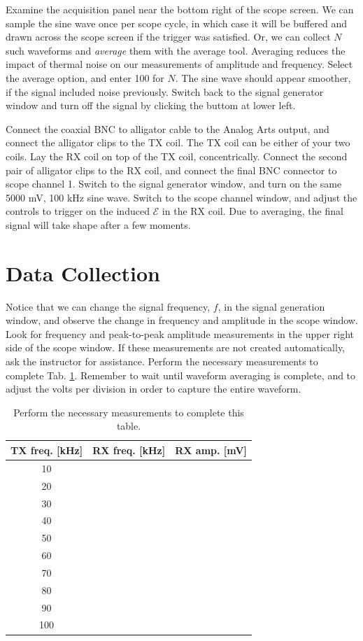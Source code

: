 \documentclass[12pt,twocolumn]{article}
\begin{document}
Examine the acquisition panel near the bottom right of the scope screen.  We can sample the sine wave once per scope cycle, in which case it will be buffered and drawn across the scope screen if the trigger was satisfied.  Or, we can collect $N$ such waveforms and \textit{average} them with the average tool.  Averaging reduces the impact of thermal noise on our measurements of amplitude and frequency.  Select the average option, and enter 100 for $N$.  The sine wave should appear smoother, if the signal included noise previously.  Switch back to the signal generator window and turn off the signal by clicking the buttom at lower left.

Connect the coaxial BNC to alligator cable to the Analog Arts output, and connect the alligator clips to the TX coil.  The TX coil can be either of your two coils.  Lay the RX coil on top of the TX coil, concentrically.  Connect the second pair of alligator clips to the RX coil, and connect the final BNC connector to scope channel 1.  Switch to the signal generator window, and turn on the same 5000 mV, 100 kHz sine wave.  Switch to the scope channel window, and adjust the controls to trigger on the induced $\mathcal{E}$ in the RX coil.  Due to averaging, the final signal will take shape after a few moments.

\section{Data Collection}

Notice that we can change the signal frequency, $f$, in the signal generation window, and observe the change in frequency and amplitude in the scope window.  Look for frequency and peak-to-peak amplitude measurements in the upper right side of the scope window.  If these measurements are not created automatically, ask the instructor for assistance.  Perform the necessary measurements to complete Tab. \ref{tab:data}.  Remember to wait until waveform averaging is complete, and to adjust the volts per division in order to capture the entire waveform.

\begin{table}[ht]
\footnotesize
\begin{tabular}{| c | c | c |}
\hline
\textbf{TX freq.} [kHz] & \textbf{RX freq.} [kHz] & \textbf{RX amp.} [mV] \\ \hline
10 & & \\ \hline
20 & & \\ \hline
30 & & \\ \hline
40 & & \\ \hline
50 & & \\ \hline
60 & & \\ \hline
70 & & \\ \hline
80 & & \\ \hline
90 & & \\ \hline
100 & & \\ \hline
\end{tabular}
\caption{\label{tab:data} Perform the necessary measurements to complete this table.}
\end{table}
\end{document}
